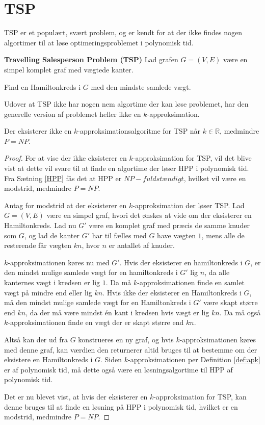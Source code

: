 \section{TSP}
TSP er et populært, svært problem, og er kendt for at der ikke findes nogen algortimer til at løse optimeringsproblemet i polynomisk tid. 

\begin{tcolorbox}
	\textbf{Travelling Salesperson Problem (TSP)} \quad Lad grafen $G=(V,E)$ være en simpel komplet graf med vægtede kanter.

	Find en Hamiltonkreds i $G$ med den mindste samlede vægt.
\end{tcolorbox}

Udover at TSP ikke har nogen nem algortime der kan løse problemet, har den generelle version af problemet heller ikke en $k$-approksimation.

\begin{thm}
	Der eksisterer ikke en $k$-approksimationsalgoritme for TSP når $k \in \mathbb{R}$, medmindre $P = NP$.
\end{thm}
\begin{proof}
	For at vise der ikke eksisterer en $k$-approksimation for TSP, vil det blive vist at dette vil svare til at finde en algortime der løser HPP i polynomisk tid.
	Fra Sætning \ref{HPP} fås det at HPP er $NP-fuldstændigt$, hvilket vil være en modstrid, medmindre $P=NP$.

	Antag for modstrid at der eksisterer en $k$-approksimation der løser TSP.
	Lad $G=(V,E)$ være en simpel graf, hvori det ønskes at vide om der eksisterer en Hamiltonkreds.
	Lad nu $G'$ være en komplet graf med præcis de samme knuder som $G$, og lad de kanter $G'$ har til fælles med $G$ have vægten $1$, mens alle de resterende får vægten $kn$, hvor $n$ er antallet af knuder.

	$k$-approksimationen køres nu med $G'$.
	Hvis der eksisterer en hamiltonkreds i $G$, er den mindst mulige samlede vægt for en hamiltonkreds i $G'$ lig $n$, da alle kanternes vægt i kredsen er lig $1$.
	Da må $k$-approksimationen finde en samlet vægt på mindre end eller lig $kn$.
	Hvis ikke der eksisterer en Hamiltonkreds i $G$, må den mindst mulige samlede vægt for en Hamiltonkreds i $G'$ være skapt større end $kn$, da der må være mindst én kant i kredsen hvis vægt er lig $kn$.
	Da må også $k$-approksimationen finde en vægt der er skapt større end $kn$.

	Altså kan der ud fra $G$ konstrueres en ny graf, og hvis $k$-approksimationen køres med denne graf, kan værdien den returnerer altid bruges til at bestemme om der eksistere en Hamiltonkreds i $G$.
	Siden $k$-approksimationen per Definition \ref{def:apk} er af polynomisk tid, må dette også være en løsningsalgortime til HPP af polynomisk tid.

	Det er nu blevet vist, at hvis der eksisterer en $k$-approksimation for TSP, kan denne bruges til at finde en løsning på HPP i polynomisk tid, hvilket er en modstrid, medmindre $P=NP$.
\end{proof}

